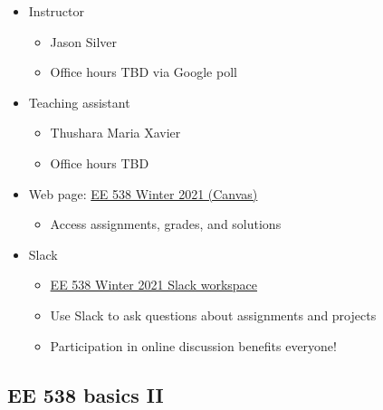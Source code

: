 \documentclass[11pt]{article}
\providecommand{\tightlist}{%
      \setlength{\itemsep}{0pt}\setlength{\parskip}{0pt}}
\begin{document}
    \begin{itemize}
\tightlist
\item
  Instructor

  \begin{itemize}
  \tightlist
  \item
    Jason Silver
  \item
    Office hours TBD via Google poll
  \end{itemize}
\item
  Teaching assistant

  \begin{itemize}
  \tightlist
  \item
    Thushara Maria Xavier
  \item
    Office hours TBD
  \end{itemize}
\item
  Web page: \href{https://canvas.uw.edu/courses/1448967}{EE 538 Winter
  2021 (Canvas)}

  \begin{itemize}
  \tightlist
  \item
    Access assignments, grades, and solutions
  \end{itemize}
\item
  Slack

  \begin{itemize}
  \tightlist
  \item
    \href{https://join.slack.com/t/uwaic2021/shared_invite/zt-k8e4c07p-6mkI7JSqfLv_lYJ21zW2ZQ}{EE
    538 Winter 2021 Slack workspace}
  \item
    Use Slack to ask questions about assignments and projects
  \item
    Participation in online discussion benefits everyone!
  \end{itemize}
\end{itemize}

    \hypertarget{ee-538-basics-ii}{%
\subsection{EE 538 basics II}\label{ee-538-basics-ii}}
\end{document}

